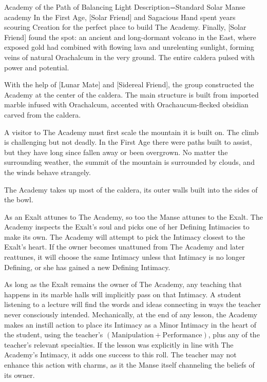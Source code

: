 \begin{Merit}{Academy of the Path of Balancing Light}{
    Description=Standard Solar Manse
}{academy}
In the First Age, [Solar Friend] and Sagacious Hand spent years scouring
Creation for the perfect place to build The Academy. Finally, [Solar Friend]
found the spot: an ancient and long-dormant volcano in the East, where exposed
gold had combined with flowing lava and unrelenting sunlight, forming veins of
natural Orachalcum in the very ground. The entire caldera pulsed with power and
potential.

With the help of [Lunar Mate] and [Sidereal Friend], the group constructed the
Academy at the center of the caldera. The main structure is built from imported
marble infused with Orachalcum, accented with Orachaucum-flecked obsidian
carved from the caldera.

A visitor to The Academy must first scale the mountain it is built on. The
climb is challenging but not deadly. In the First Age there were paths built to
assist, but they have long since fallen away or been overgrown. No matter the
surrounding weather, the summit of the mountain is surrounded by clouds, and
the winds behave strangely.

The Academy takes up most of the caldera, its outer walls built into the sides
of the bowl.


As an Exalt attunes to The Academy, so too the Manse attunes to the Exalt. The
Academy inspects the Exalt's soul and picks one of her Defining Intimacies to
make its own. The Academy will attempt to pick the Intimacy closest to the
Exalt's heart. If the owner becomes unattuned from The Academy and later
reattunes, it will choose the same Intimacy unless that Intimacy is no longer
Defining, or she has gained a new Defining Intimacy.

As long as the Exalt remains the owner of The Academy, any teaching that
happens in its marble halls will implicitly pass on that Intimacy. A student
listening to a lecture will find the words and ideas connecting in ways the
teacher never consciously intended. Mechanically, at the end of any lesson, the
Academy makes an instill action to place its Intimacy as a Minor Intimacy in
the heart of the student, using the teacher's $(\mathrm{Manipulation} +
\mathrm{Performance})$, plus any of the teacher's relevant specialties. If the
lesson was explicitly in line with The Academy's Intimacy, it adds one success
to this roll. The teacher may not enhance this action with charms, as it the
Manse itself channeling the beliefs of its owner.
\end{Merit}

